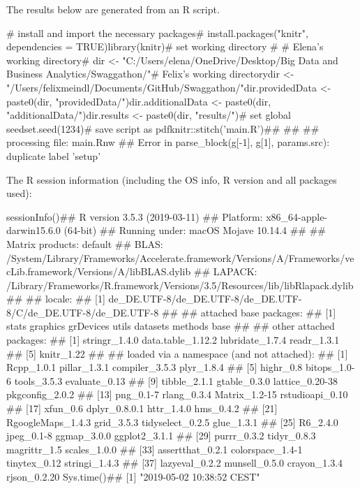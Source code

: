 \documentclass{article}\usepackage[]{graphicx}\usepackage[]{color}
\begin{document}
\title{\title{\title{}}}



\maketitle
The results below are generated from an R script.

# install and import the necessary packages# install.packages("knitr", dependencies = TRUE)library(knitr)# set working directory # # Elena's working directory# dir <- "C:/Users/elena/OneDrive/Desktop/Big Data and Business Analytics/Swaggathon/"# Felix's working directorydir <- "/Users/felixmeindl/Documents/GitHub/Swaggathon/"dir.providedData <- paste0(dir, "providedData/")dir.additionalData <- paste0(dir, "additionalData/")dir.results <- paste0(dir, "results/")# set global seedset.seed(1234)# save script as pdfknitr::stitch('main.R')## 
## 
## processing file: main.Rnw
## Error in parse_block(g[-1], g[1], params.src): duplicate label 'setup'


The R session information (including the OS info, R version and all
packages used):

sessionInfo()## R version 3.5.3 (2019-03-11)
## Platform: x86_64-apple-darwin15.6.0 (64-bit)
## Running under: macOS Mojave 10.14.4
## 
## Matrix products: default
## BLAS: /System/Library/Frameworks/Accelerate.framework/Versions/A/Frameworks/vecLib.framework/Versions/A/libBLAS.dylib
## LAPACK: /Library/Frameworks/R.framework/Versions/3.5/Resources/lib/libRlapack.dylib
## 
## locale:
## [1] de_DE.UTF-8/de_DE.UTF-8/de_DE.UTF-8/C/de_DE.UTF-8/de_DE.UTF-8
## 
## attached base packages:
## [1] stats     graphics  grDevices utils     datasets  methods   base     
## 
## other attached packages:
## [1] stringr_1.4.0     data.table_1.12.2 lubridate_1.7.4   readr_1.3.1      
## [5] knitr_1.22       
## 
## loaded via a namespace (and not attached):
##  [1] Rcpp_1.0.1        pillar_1.3.1      compiler_3.5.3    plyr_1.8.4       
##  [5] highr_0.8         bitops_1.0-6      tools_3.5.3       evaluate_0.13    
##  [9] tibble_2.1.1      gtable_0.3.0      lattice_0.20-38   pkgconfig_2.0.2  
## [13] png_0.1-7         rlang_0.3.4       Matrix_1.2-15     rstudioapi_0.10  
## [17] xfun_0.6          dplyr_0.8.0.1     httr_1.4.0        hms_0.4.2        
## [21] RgoogleMaps_1.4.3 grid_3.5.3        tidyselect_0.2.5  glue_1.3.1       
## [25] R6_2.4.0          jpeg_0.1-8        ggmap_3.0.0       ggplot2_3.1.1    
## [29] purrr_0.3.2       tidyr_0.8.3       magrittr_1.5      scales_1.0.0     
## [33] assertthat_0.2.1  colorspace_1.4-1  tinytex_0.12      stringi_1.4.3    
## [37] lazyeval_0.2.2    munsell_0.5.0     crayon_1.3.4      rjson_0.2.20
Sys.time()## [1] "2019-05-02 10:38:52 CEST"
\end{document}

